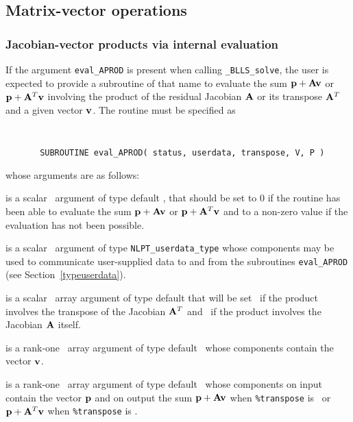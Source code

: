\documentclass{galahad}
\newcommand{\packagename}{BLLS}
\newcommand{\fullpackagename}{\libraryname\_\packagename}
\newcommand{\solver}{{\tt \fullpackagename\_solve}}
\begin{document}
\subsection{Matrix-vector operations\label{fdv}}


\subsubsection{Jacobian-vector products via internal evaluation\label{jvp}}

If the argument {\tt eval\_APROD} is present when calling \solver, the
user is expected to provide a subroutine of that name to evaluate the
sum ${\mathbf{p}} + {\mathbf{A}} {\mathbf{v}}$ or ${\mathbf{p}} + {\mathbf{A}}^T{\mathbf{v}}$ involving the
product of the residual Jacobian ${\mathbf{A}}$ or its transpose ${\mathbf{A}}^T$
and a given vector ${\mathbf{v}}$.
The routine must be specified as

\def\baselinestretch{0.8}
{\tt
\begin{verbatim}
       SUBROUTINE eval_APROD( status, userdata, transpose, V, P )
\end{verbatim} }
\def\baselinestretch{1.0}
\noindent whose arguments are as follows:

\begin{description}
 is a scalar \intentout\ argument of type default \integer,
that should be set to 0 if the routine has been able to evaluate the
sum ${\mathbf{p}} + {\mathbf{A}} {\mathbf{v}}$ or ${\mathbf{p}} + {\mathbf{A}}^T{\mathbf{v}}$
and to a non-zero value if the evaluation has not been possible.

 is a scalar \intentinout\ argument of type
{\tt NLPT\_userdata\_type} whose components may be used
to communicate user-supplied data to and from the subroutines
{\tt eval\_APROD}
(see Section~\ref{typeuserdata}).

 is a scalar \intentin\ array argument of type
default that will be set \true\ if the product involves the transpose
of the Jacobian ${\mathbf{A}}^T$ and \false\ if the product involves
the Jacobian ${\mathbf{A}}$ itself.

 is a rank-one \intentin\ array argument of type default \realdp\
whose components contain the vector ${\mathbf{v}}$.

 is a rank-one \intentinout\ array argument of type default \realdp\
whose components on input contain the vector ${\mathbf{p}}$ and on output the
sum ${\mathbf{p}} + {\mathbf{A}} {\mathbf{v}}$ when {\tt \%transpose} is \false\ or
${\mathbf{p}} + {\mathbf{A}}^T {\mathbf{v}}$ when {\tt \%transpose} is \true.

\end{description}
\end{document}
